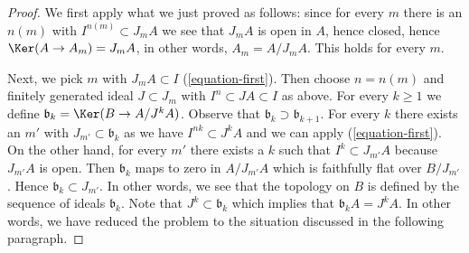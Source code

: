 \begin{proof}
\medskip\noindent
We first apply what we just proved as follows: since for every $m$ there
is an $n(m)$ with $I^{n(m)} \subset J_mA$ we see that
$J_mA$ is open in $A$, hence closed, hence $\Ker(A \to A_m) = J_mA$,
in other words, $A_m = A/J_mA$. This holds for every $m$.

\medskip\noindent
Next, we pick $m$ with $J_mA \subset I$ (\ref{equation-first}).
Then choose $n = n(m)$ and finitely generated ideal $J \subset J_m$
with $I^n \subset JA \subset I$ as above.
For every $k \geq 1$ we define $\mathfrak b_k = \Ker(B \to A/J^kA)$.
Observe that $\mathfrak b_k \supset \mathfrak b_{k + 1}$.
For every $k$ there exists
an $m'$ with $J_{m'} \subset \mathfrak b_k$ as we have
$I^{nk} \subset J^kA$ and we can apply (\ref{equation-first}).
On the other hand, for every $m'$ there exists a $k$ such that
$I^k \subset J_{m'}A$ because $J_{m'}A$ is open. Then
$\mathfrak b_k$ maps to zero in $A/J_{m'}A$ which is faithfully
flat over $B/J_{m'}$. Hence $\mathfrak b_k \subset J_{m'}$.
In other words, we see that the topology on $B$ is defined by the
sequence of ideals $\mathfrak b_k$. Note that $J^k \subset \mathfrak b_k$
which implies that $\mathfrak b_k A = J^kA$.
In other words, we have reduced the problem to the
situation discussed in the following paragraph.


\end{proof}
